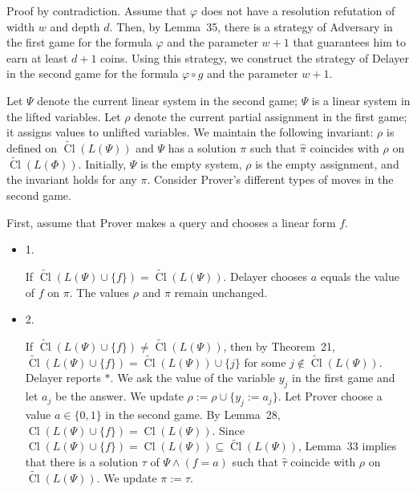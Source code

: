 Proof by contradiction. Assume that $\varphi$ does not have a resolution refutation of width $w$ and depth $d$. Then, by Lemma 35, there is a strategy of Adversary in the first game for the formula $\varphi$ and the parameter $w+1$ that guarantees him to earn at least $d+1$ coins.
Using this strategy, we construct the strategy of Delayer in the second game for the formula $\varphi\circ g$ and the parameter $w+1$.\par



Let $\Psi$ denote the current linear system in the second game; $\Psi$ is a linear system in the lifted variables.
Let $\rho$ denote the current partial assignment in the first game; it assigns values to unlifted variables. We maintain the following invariant: $\rho$ is defined on $\widetilde{\mathop{\mathrm{Cl}}}(L(\Psi))$ and $\Psi$ has a solution $\pi$ such that $\hat{\pi}$ coincides with $\rho$ on $\widetilde{\mathop{\mathrm{Cl}}}(L(\Phi))$. Initially, $\Psi$ is the empty system, $\rho$ is the empty assignment, and the invariant holds for any $\pi$. Consider Prover’s different types of moves in the second game.\par



First, assume that Prover makes a query and chooses a linear form $f$.\par



\begin{itemize}


\item 
1. 


If $\widetilde{\mathop{\mathrm{Cl}}}(L(\Psi)\cup\{f\})=\widetilde{\mathop{\mathrm{Cl}}}(L(\Psi))$. Delayer chooses $a$ equals the value of $f$ on $\pi$. The values $\rho$ and $\pi$ remain unchanged.\par





\item 
2. 


If $\widetilde{\mathop{\mathrm{Cl}}}(L(\Psi)\cup\{f\})\neq\widetilde{\mathop{\mathrm{Cl}}}(L(\Psi))$, then by Theorem 21, $\widetilde{\mathop{\mathrm{Cl}}}(L(\Psi)\cup\{f\})=\widetilde{\mathop{\mathrm{Cl}}}(L(\Psi))\cup\{j\}$ for some $j\notin\widetilde{\mathop{\mathrm{Cl}}}(L(\Psi))$. Delayer reports $*$.
We ask the value of the variable $y_{j}$ in the first game and let $a_{j}$ be the answer. We update $\rho:=\rho\cup\{y_{j}:=a_{j}\}$.
Let Prover choose a value $a\in\{0,1\}$ in the second game.
By Lemma 28, $\mathop{\mathrm{Cl}}(L(\Psi)\cup\{f\})=\mathop{\mathrm{Cl}}(L(\Psi))$. Since $\mathop{\mathrm{Cl}}(L(\Psi)\cup\{f\})=\mathop{\mathrm{Cl}}(L(\Psi))\subseteq\widetilde{\mathop{\mathrm{Cl}}}(L(\Psi))$, Lemma 33 implies that there is a solution $\tau$ of $\Psi\land(f=a)$ such that $\hat{\tau}$ coincide with $\rho$ on $\widetilde{\mathop{\mathrm{Cl}}}(L(\Psi))$. We update $\pi:=\tau$.\par





\end{itemize}



